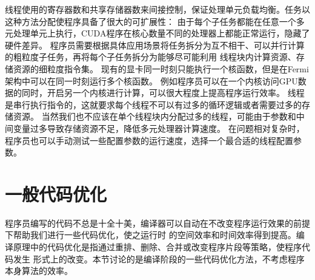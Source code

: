 线程使用的寄存器数和共享存储器数来间接控制，保证处理单元负载均衡。任务以这种方法分配使程序具备了很大的可扩展性：
由于每个子任务都能在任意一个多元处理单元上执行，CUDA程序在核心数量不同的处理器上都能正常运行，隐藏了硬件差异。
程序员需要根据具体应用场景将任务拆分为互不相干、可以并行计算的粗粒度子任务，再将每个子任务拆分为能够尽可能利用
线程块内计算资源、存储资源的细粒度指令集。
现有的显卡同一时刻只能执行一个核函数，但是在Fermi架构中可以在同一时刻运行多个核函数。
例如程序员可以在一个内核访问GPU数据的同时，开启另一个内核进行计算，可以很大程度上提高程序运行效率。
线程是串行执行指令的，这就要求每个线程不可以有过多的循环逻辑或者需要过多的存储资源。
当然我们也不应该在单个线程块内分配过多的线程，可能由于参数和中间变量过多导致存储资源不足，降低多元处理器计算速度。
在问题相对复杂时，程序员也可以手动测试一些配置参数的运行速度，选择一个最合适的线程配置参数。

\section{一般代码优化}
程序员编写的代码不总是十全十美，编译器可以自动在不改变程序运行效果的前提下帮助我们进行一些代码优化，使之运行时
的空间效率和时间效率得到提高。编译原理中的代码优化是指通过重排、删除、合并或改变程序片段等策略，使程序代码发生
形式上的改变。本节讨论的是编译阶段的一些代码优化方法，不考虑程序本身算法的效率。
